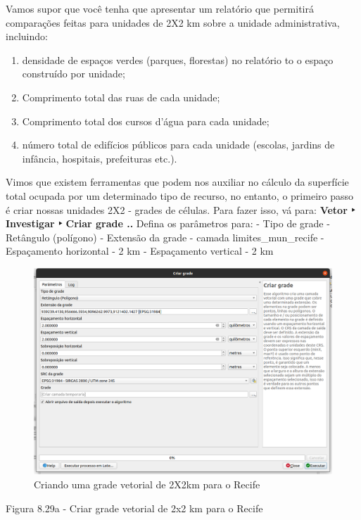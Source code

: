\documentclass[
]{book}
\providecommand{\tightlist}{%
  \setlength{\itemsep}{0pt}\setlength{\parskip}{0pt}}
\begin{document}
Vamos supor que você tenha que apresentar um relatório que permitirá comparações feitas para unidades de 2X2 km sobre a unidade administrativa, incluindo:

\begin{enumerate}
\def\labelenumi{\arabic{enumi}.}
\tightlist
\item
  densidade de espaços verdes (parques, florestas) no relatório to o espaço construído por unidade;
\item
  Comprimento total das ruas de cada unidade;
\item
  Comprimento total dos cursos d'água para cada unidade;
\item
  número total de edifícios públicos para cada unidade (escolas, jardins de infância, hospitais, prefeituras etc.).
\end{enumerate}

Vimos que existem ferramentas que podem nos auxiliar no cálculo da superfície total ocupada por um determinado tipo de recurso, no entanto, o primeiro passo é criar nossas unidades 2X2 - grades de células. Para fazer isso, vá para: \textbf{Vetor ‣ Investigar ‣ Criar grade ..} Defina os parâmetros para:
- Tipo de grade - Retângulo (polígono)
- Extensão da grade - camada limites\_mun\_recife
- Espaçamento horizontal - 2 km
- Espaçamento vertical - 2 km

\begin{figure}
\centering
\includegraphics{media/modulo8/fig829_a.png}
\caption{Criando uma grade vetorial de 2X2km para o Recife}
\end{figure}

Figura 8.29a - Criar grade vetorial de 2x2 km para o Recife
\end{document}
